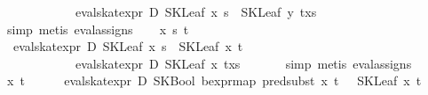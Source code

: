 \begin{isabellebody}
\ \ \ \ \ \ \ \ \ \ \ \ eval{}skat{}expr\ D\ {}SKLeaf\ x\ s\ {}{}{}\ SKLeaf\ y\ {}t{}x{}s{}{}{}\ {}{}\isanewline
\ \ \ \ \isamarkupfalse%
\ {}simp{}\ metis\ eval{}assigns{}{}\isanewline
{}\isamarkupfalse%
\isanewline
\ \ \isamarkupfalse%
\ x\ s\ t\isanewline
\ \ \isamarkupfalse%
\ {}{}{}{}\ eval{}skat{}expr\ D\ {}SKLeaf\ x\ s\ {}{}{}\ SKLeaf\ x\ t{}\ {}\ {}\isanewline
\ \ \ \ \ \ \ \ \ \ \ \ eval{}skat{}expr\ D\ {}SKLeaf\ x\ {}t{}x{}s{}{}{}\ {}{}\isanewline
\ \ \ \ \isamarkupfalse%
\ {}simp{}\ metis\ eval{}assigns{}{}\isanewline
{}\isamarkupfalse%
\isanewline
\ \ \isamarkupfalse%
\ x\ t\ {}\isanewline
\ \ \isamarkupfalse%
\ {}{}{}{}\ eval{}skat{}expr\ D\ {}SKBool\ {}bexpr{}map\ {}pred{}subst\ x\ t{}\ {}{}\ {}{}{}\ SKLeaf\ x\ t{}\ {}\ {}\isanewline

\end{isabellebody}

